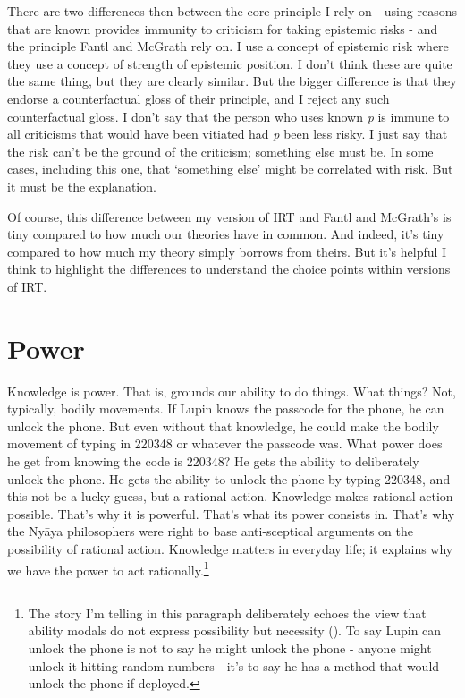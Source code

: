 \documentclass[
  10pt,
  letterpaper,
  twoside]{scrbook}
\begin{document}
There are two differences then between the core principle I rely on -
using reasons that are known provides immunity to criticism for taking
epistemic risks - and the principle Fantl and McGrath rely on. I use a
concept of epistemic risk where they use a concept of strength of
epistemic position. I don't think these are quite the same thing, but
they are clearly similar. But the bigger difference is that they endorse
a counterfactual gloss of their principle, and I reject any such
counterfactual gloss. I don't say that the person who uses known
\emph{p} is immune to all criticisms that would have been vitiated had
\emph{p} been less risky. I just say that the risk can't be the ground
of the criticism; something else must be. In some cases, including this
one, that `something else' might be correlated with risk. But it must be
the explanation.

Of course, this difference between my version of IRT and Fantl and
McGrath's is tiny compared to how much our theories have in common. And
indeed, it's tiny compared to how much my theory simply borrows from
theirs. But it's helpful I think to highlight the differences to
understand the choice points within versions of IRT.


\chapter{Power}\label{sec-power}

Knowledge is power. That is, grounds our ability to do things. What
things? Not, typically, bodily movements. If Lupin knows the passcode
for the phone, he can unlock the phone. But even without that knowledge,
he could make the bodily movement of typing in 220348 or whatever the
passcode was. What power does he get from knowing the code is 220348? He
gets the ability to deliberately unlock the phone. He gets the ability
to unlock the phone by typing 220348, and this not be a lucky guess, but
a rational action. Knowledge makes rational action possible. That's why
it is powerful. That's what its power consists in. That's why the Nyāya
philosophers were right to base anti-sceptical arguments on the
possibility of rational action. Knowledge matters in everyday life; it
explains why we have the power to act rationally.\footnote{The story I'm
  telling in this paragraph deliberately echoes the view that ability
  modals do not express possibility but necessity
  (). To say Lupin can unlock the phone is not to say he might
  unlock the phone - anyone might unlock it hitting random numbers -
  it's to say he has a method that would unlock the phone if deployed.}
\end{document}
